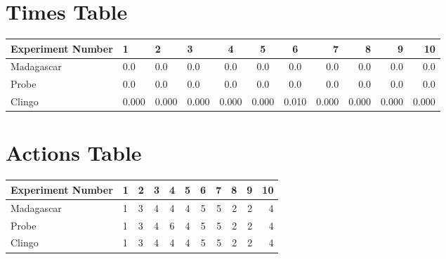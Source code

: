 \documentclass[8pt]{article}
\begin{document}
\begin{landscape}
\section{Times Table}\begin{tabular}{ | l | l | l | l | c | c | c | r | r | r | r | }\hline
Experiment Number & 1 & 2 & 3 & 4 & 5 & 6 & 7 & 8 & 9 & 10\\  \hline
Madagascar & 0.0 & 0.0 & 0.0 & 0.0 & 0.0 & 0.0 & 0.0 & 0.0 & 0.0 & 0.0\\  \hline
Probe & 0.0 & 0.0 & 0.0 & 0.0 & 0.0 & 0.0 & 0.0 & 0.0 & 0.0 & 0.0\\  \hline
Clingo & 0.000 & 0.000 & 0.000 & 0.000 & 0.000 & 0.010 & 0.000 & 0.000 & 0.000 & 0.000\\  \hline
\end{tabular}
\section{Actions Table}\begin{tabular}{ | l | l | l | l | c | c | c | r | r | r | r | }\hline
Experiment Number & 1 & 2 & 3 & 4 & 5 & 6 & 7 & 8 & 9 & 10\\ \hline
 Madagascar & 1 & 3 & 4 & 4 & 4 & 5 & 5 & 2 & 2 & 4\\ \hline
 Probe & 1 & 3 & 4 & 6 & 4 & 5 & 5 & 2 & 2 & 4\\ \hline
 Clingo & 1 & 3 & 4 & 4 & 4 & 5 & 5 & 2 & 2 & 4\\ \hline
\end{tabular}
\end{landscape}
\end{document}
